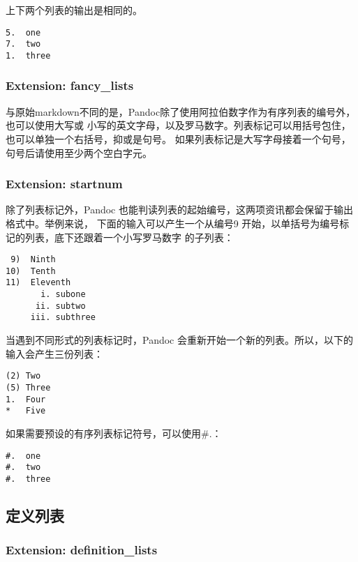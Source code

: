 \documentclass[fancyhdr,bookmark]{ctexbook}
\begin{document}
上下两个列表的输出是相同的。

\begin{lstlisting}
5.  one
7.  two
1.  three
\end{lstlisting}

\subsubsection{Extension: fancy\_lists}\label{extension-fancy_lists}

与原始markdown不同的是，Pandoc除了使用阿拉伯数字作为有序列表的编号外，也可以使用大写或
小写的英文字母，以及罗马数字。列表标记可以用括号包住，也可以单独一个右括号，抑或是句号。
如果列表标记是大写字母接着一个句号，句号后请使用至少两个空白字元。

\subsubsection{Extension: startnum}\label{extension-startnum}

除了列表标记外，Pandoc
也能判读列表的起始编号，这两项资讯都会保留于输出格式中。举例来说，
下面的输入可以产生一个从编号9
开始，以单括号为编号标记的列表，底下还跟着一个小写罗马数字 的子列表：

\begin{lstlisting}
 9)  Ninth
10)  Tenth
11)  Eleventh
       i. subone
      ii. subtwo
     iii. subthree
\end{lstlisting}

当遇到不同形式的列表标记时，Pandoc
会重新开始一个新的列表。所以，以下的输入会产生三份列表：

\begin{lstlisting}
(2) Two
(5) Three
1.  Four
*   Five
\end{lstlisting}

如果需要预设的有序列表标记符号，可以使用\#.：

\begin{lstlisting}
#.  one
#.  two
#.  three
\end{lstlisting}

\subsection{定义列表}\label{ux5b9aux4e49ux5217ux8868}

\subsubsection{Extension:
definition\_lists}\label{extension-definition_lists}
\end{document}
